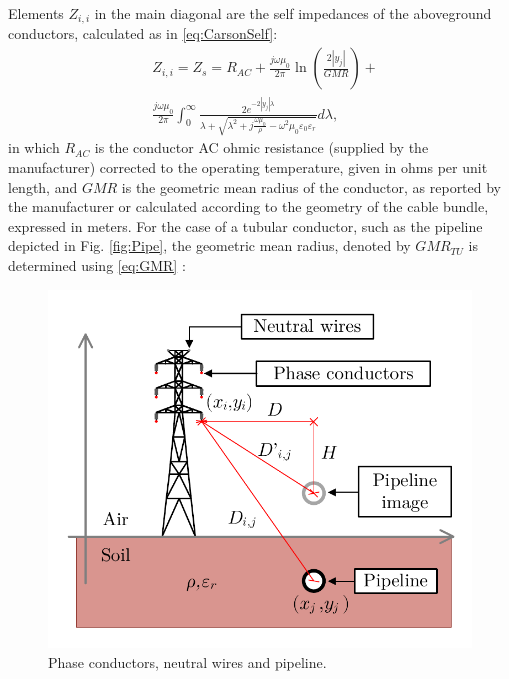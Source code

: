 \documentclass[conference]{IEEEtran}
\begin{document}
Elements $Z_{i,i}$ in the main diagonal are the self impedances of the aboveground conductors, calculated as in \eqref{eq:CarsonSelf}:
\begin{equation}\label{eq:CarsonSelf}
	\begin{aligned}
		&Z_{i,i}=Z_{s}=R_{AC}+\frac{j\omega\mu_{0}}{2\pi}\ln\left(\frac{2|y_j|}{GMR}\right) + \\
		&
		\frac{j\omega\mu_{0}}{2\pi}\int_{0}^{\infty}\frac{2e^{-2|y_j|\lambda}}{\lambda+\sqrt{\lambda^2+j\frac{\omega\mu_{0}}{\rho}-\omega^2\mu_{0}\varepsilon_{0}\varepsilon_{r}}} d\lambda,
	\end{aligned}
\end{equation}
in which $R_{AC}$ is the conductor AC ohmic resistance (supplied by the manufacturer) corrected to the operating temperature, given in ohms per unit length, and $GMR$ is the geometric mean radius of the conductor, as reported by the manufacturer or calculated according to the geometry of the cable bundle, expressed in meters. For the case of a tubular conductor, such as the pipeline depicted in Fig. \ref{fig:Pipe}, the geometric mean radius, denoted by $GMR_{TU}$ is determined using \eqref{eq:GMR} \cite{Seneff1947}:
\begin{figure}[!t]
	\begin{center}
		\includegraphics[width=.8\columnwidth]{fig/VistaTorreDuto.pdf}
		\caption{Phase conductors, neutral wires and pipeline.}
		\label{fig:VistaTorreDuto}
	\end{center}
\end{figure}
\end{document}
